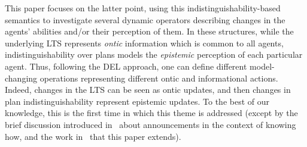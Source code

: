 \begin{textonuevo}
%
%
%

\smallskip

This paper focuses on the latter point, using this in\-dis\-tin\-guisha\-bil\-i\-ty-based semantics to investigate several dynamic operators describing changes in the agents' abilities and/or their perception of them. In these structures, while the underlying LTS represents \emph{ontic} information which is common to all agents, indistinguishability over plans models the \emph{epistemic} perception of each particular agent. Thus, following the DEL approach, one can define different model-changing operations representing different ontic and informational actions. Indeed, changes in the LTS can be seen as ontic updates, and then changes in plan indistinguishability represent epistemic updates. To the best of our knowledge, this is the first time in which this theme is addressed (except by the brief discussion introduced in~\cite{Wang2016} about announcements in the context of knowing how, and the work in~\cite{AFSV22} that this paper extends). 

\end{textonuevo}

